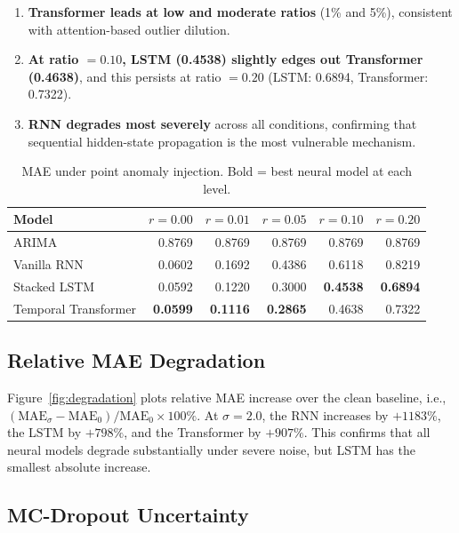 \documentclass[runningheads]{llncs}
\begin{document}
\begin{enumerate}
  \item \textbf{Transformer leads at low and moderate ratios} (1\% and 5\%), consistent with attention-based outlier dilution.
  \item \textbf{At ratio $= 0.10$, LSTM (0.4538) slightly edges out Transformer (0.4638)}, and this persists at ratio $= 0.20$ (LSTM: 0.6894, Transformer: 0.7322).
  \item \textbf{RNN degrades most severely} across all conditions, confirming that sequential hidden-state propagation is the most vulnerable mechanism.
\end{enumerate}

\begin{table}[H]
\centering
\caption{MAE under point anomaly injection. Bold = best neural model at each level.}
\label{tab:anomaly}
\begin{tabular}{lrrrrr}
\toprule
\textbf{Model} & $r=0.00$ & $r=0.01$ & $r=0.05$ & $r=0.10$ & $r=0.20$ \\
\midrule
ARIMA               & 0.8769 & 0.8769 & 0.8769 & 0.8769 & 0.8769 \\
Vanilla RNN         & 0.0602 & 0.1692 & 0.4386 & 0.6118 & 0.8219 \\
Stacked LSTM        & 0.0592 & 0.1220 & 0.3000 & \textbf{0.4538} & \textbf{0.6894} \\
Temporal Transformer & \textbf{0.0599} & \textbf{0.1116} & \textbf{0.2865} & 0.4638 & 0.7322 \\
\bottomrule
\end{tabular}
\end{table}

\subsection{Relative MAE Degradation}
\label{sec:degradation}

Figure~\ref{fig:degradation} plots relative MAE increase over the clean baseline, i.e., $(\text{MAE}_\sigma - \text{MAE}_0) / \text{MAE}_0 \times 100\%$. At $\sigma = 2.0$, the RNN increases by $+1183\%$, the LSTM by $+798\%$, and the Transformer by $+907\%$. This confirms that all neural models degrade substantially under severe noise, but LSTM has the smallest absolute increase.

\subsection{MC-Dropout Uncertainty}
\label{sec:uncertainty}
\end{document}

